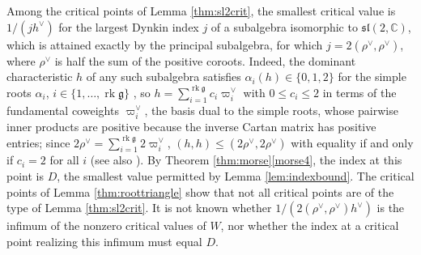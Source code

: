 \documentclass[leqno,10pt]{amsart}
\theoremstyle{definition}
\numberwithin{equation}{section}
\newcommand{\al}{\alpha}
\newcommand{\sll}{\mathfrak{sl}}
\newcommand{\g}{\mathfrak{g}}
\newcommand{\com}{\mathbb C}
\newcommand{\hv}{h^\vee}
\begin{document}
\begin{remark}\label{rem:minimalvalue}
Among the critical points of Lemma \ref{thm:sl2crit}, the smallest critical value is $1/(j\hv)$ for the largest Dynkin index $j$ of a subalgebra isomorphic to $\sll(2, \com)$, which is attained exactly by the principal subalgebra, for which $j = 2(\rho^{\vee}, \rho^{\vee})$, where $\rho^{\vee}$ is half the sum of the positive coroots. Indeed, the dominant characteristic $h$ of any such subalgebra satisfies $\al_{i}(h) \in \{0, 1, 2\}$ for the simple roots $\al_{i}$, $i \in \{1, \dots, \operatorname{rk}\g\}$ \cite[Section~3.5]{Collingwood-McGovern}, so $h = \sum_{i=1}^{\operatorname{rk}\g}c_{i}\varpi_{i}^{\vee}$ with $0 \leq c_{i} \leq 2$ in terms of the fundamental coweights $\varpi_{i}^{\vee}$, the basis dual to the simple roots, whose pairwise inner products are positive because the inverse Cartan matrix has positive entries; since $2\rho^{\vee} = \sum_{i=1}^{\operatorname{rk}\g}2\varpi_{i}^{\vee}$, $(h, h) \leq (2\rho^{\vee}, 2\rho^{\vee})$ with equality if and only if $c_{i} = 2$ for all $i$ (see also \cite{Panyushev-dynkinindex}). By Theorem \ref{thm:morse}\ref{morse4}, the index at this point is $D$, the smallest value permitted by Lemma \ref{lem:indexbound}. The critical points of Lemma \ref{thm:roottriangle} show that not all critical points are of the type of Lemma \ref{thm:sl2crit}. It is not known whether $1/(2(\rho^{\vee}, \rho^{\vee})\hv)$ is the infimum of the nonzero critical values of $W$, nor whether the index at a critical point realizing this infimum must equal $D$.
\end{remark}
\end{document}
